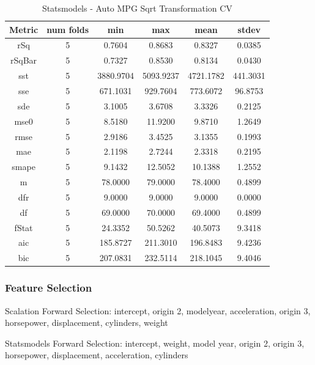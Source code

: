 \documentclass{article}
\begin{document}
\begin{table}[H]
\centering
\caption{Statsmodels - Auto MPG Sqrt Transformation CV}
\label{tab:Statsmodels - Auto MPG Sqrt Transformation CV}
\begin{tabular}{|c|c|c|c|c|c|}\hline
Metric & num folds & min & max & mean & stdev \\ \hline \hline
rSq & 5 & 0.7604 & 0.8683 & 0.8327 & 0.0385 \\ \hline
rSqBar & 5 & 0.7327 & 0.8530 & 0.8134 & 0.0430 \\ \hline
sst & 5 & 3880.9704 & 5093.9237 & 4721.1782 & 441.3031 \\ \hline
sse & 5 & 671.1031 & 929.7604 & 773.6072 & 96.8753 \\ \hline
sde & 5 & 3.1005 & 3.6708 & 3.3326 & 0.2125 \\ \hline
mse0 & 5 & 8.5180 & 11.9200 & 9.8710 & 1.2649 \\ \hline
rmse & 5 & 2.9186 & 3.4525 & 3.1355 & 0.1993 \\ \hline
mae & 5 & 2.1198 & 2.7244 & 2.3318 & 0.2195 \\ \hline
smape & 5 & 9.1432 & 12.5052 & 10.1388 & 1.2552 \\ \hline
m & 5 & 78.0000 & 79.0000 & 78.4000 & 0.4899 \\ \hline
dfr & 5 & 9.0000 & 9.0000 & 9.0000 & 0.0000 \\ \hline
df & 5 & 69.0000 & 70.0000 & 69.4000 & 0.4899 \\ \hline
fStat & 5 & 24.3352 & 50.5262 & 40.5073 & 9.3418 \\ \hline
aic & 5 & 185.8727 & 211.3010 & 196.8483 & 9.4236 \\ \hline
bic & 5 & 207.0831 & 232.5114 & 218.1045 & 9.4046 \\ \hline
\end{tabular}
\end{table}

\subsubsection{Feature Selection}

Scalation Forward Selection: intercept, origin 2, modelyear, acceleration, origin 3, horsepower, displacement, cylinders, weight

Statsmodels Forward Selection: intercept, weight, model year, origin 2, origin 3, horsepower, displacement, acceleration, cylinders
\end{document}
